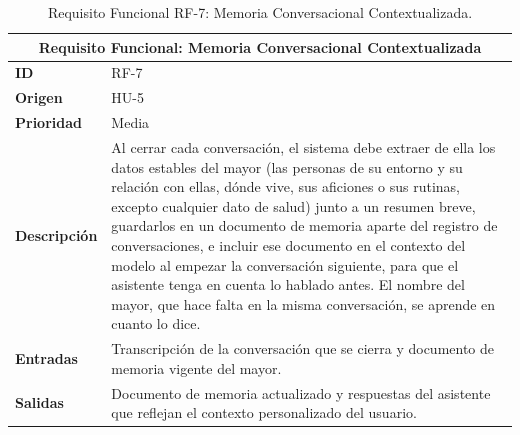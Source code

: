 \begin{table}[htbp]
    \centering
    \caption{Requisito Funcional RF-7: Memoria Conversacional Contextualizada.}
    \label{tab:rf7}
    \renewcommand{\arraystretch}{1.3}
    \begin{tabular}{|l|>{\raggedright\arraybackslash}p{}|}
        \hline
        \multicolumn{2}{|c|}{\textbf{Requisito Funcional: Memoria Conversacional Contextualizada}} \\
        \hline
        \textbf{ID} & RF-7 \\
        \hline
        \textbf{Origen} & HU-5 \\
        \hline
        \textbf{Prioridad} & Media \\
        \hline
        \textbf{Descripción} & Al cerrar cada conversación, el sistema debe extraer de ella los datos estables del mayor (las personas de su entorno y su relación con ellas, dónde vive, sus aficiones o sus rutinas, excepto cualquier dato de salud) junto a un resumen breve, guardarlos en un documento de memoria aparte del registro de conversaciones, e incluir ese documento en el contexto del modelo al empezar la conversación siguiente, para que el asistente tenga en cuenta lo hablado antes. El nombre del mayor, que hace falta en la misma conversación, se aprende en cuanto lo dice. \\
        \hline
        \textbf{Entradas} & Transcripción de la conversación que se cierra y documento de memoria vigente del mayor. \\
        \hline
        \textbf{Salidas} & Documento de memoria actualizado y respuestas del asistente que reflejan el contexto personalizado del usuario. \\
        \hline
    \end{tabular}

\end{table}

